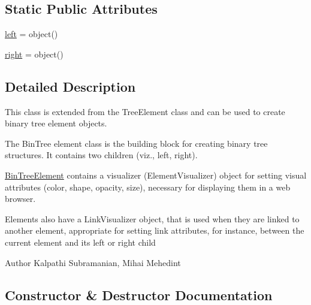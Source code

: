 \subsection*{Static Public Attributes}
\begin{DoxyCompactItemize}
\item 
\mbox{\hyperlink{class_bridges_1_1bin__tree__element_1_1_bin_tree_element_a1e8797babdfccd26560b34c3971f95d7}{left}} = object()
\item 
\mbox{\hyperlink{class_bridges_1_1bin__tree__element_1_1_bin_tree_element_a3ba9d7279bf056e6c7d50aaa5d103d49}{right}} = object()
\end{DoxyCompactItemize}


\subsection{Detailed Description}
This class is extended from the Tree\+Element class and can be used to create binary tree element objects. 

The Bin\+Tree element class is the building block for creating binary tree structures. It contains two children (viz., left, right).

\mbox{\hyperlink{class_bridges_1_1bin__tree__element_1_1_bin_tree_element}{Bin\+Tree\+Element}} contains a visualizer (Element\+Visualizer) object for setting visual attributes (color, shape, opacity, size), necessary for displaying them in a web browser.

Elements also have a Link\+Visualizer object, that is used when they are linked to another element, appropriate for setting link attributes, for instance, between the current element and its left or right child

\begin{DoxyAuthor}{Author}
Kalpathi Subramanian, Mihai Mehedint 
\end{DoxyAuthor}


\subsection{Constructor \& Destructor Documentation}
\mbox{\label{class_bridges_1_1bin__tree__element_1_1_bin_tree_element_a2b1a8f9b4fcf48cd729cbaef55bc6395}} 
